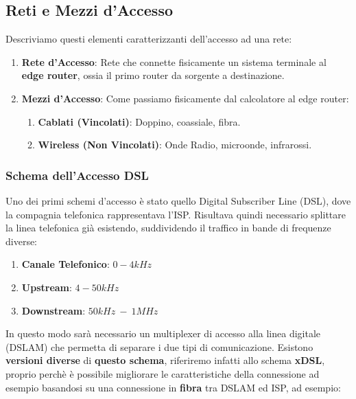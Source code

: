 \documentclass{article}
\begin{document}
\subsection{Reti e Mezzi d'Accesso}

Descriviamo questi elementi caratterizzanti dell'accesso ad una rete:

\begin{enumerate}
    \item \textbf{Rete d'Accesso}: Rete che connette fisicamente un sistema terminale al \textbf{edge router}, ossia il primo router da sorgente a destinazione.
    \item \textbf{Mezzi d'Accesso}: Come passiamo fisicamente dal calcolatore al edge router:
    \begin{enumerate}
        \item \textbf{Cablati (Vincolati)}: Doppino, coassiale, fibra.
        \item \textbf{Wireless (Non Vincolati)}: Onde Radio, microonde, infrarossi.
    \end{enumerate}
\end{enumerate}

\subsubsection{Schema dell'Accesso DSL}

Uno dei primi schemi d'accesso è stato quello Digital Subscriber Line (DSL), dove la compagnia telefonica rappresentava l'ISP.
Risultava quindi necessario splittare la linea telefonica già esistendo, suddividendo il traffico in bande di frequenze diverse:

\begin{enumerate}
    \item \textbf{Canale Telefonico}: $0-4 kHz$
    \item \textbf{Upstream}: $4-50 kHz$
    \item \textbf{Downstream}: $50 kHz \: - \: 1 MHz$
\end{enumerate}

\newpage

In questo modo sarà necessario un multiplexer di accesso alla linea digitale (DSLAM) che permetta di separare i due tipi di comunicazione. Esistono \textbf{versioni diverse}
di \textbf{questo schema}, riferiremo infatti allo schema \textbf{xDSL}, proprio perchè è possibile migliorare le caratteristiche della connessione ad esempio basandosi su una connessione
in \textbf{fibra} tra DSLAM ed ISP, ad esempio:
\end{document}
